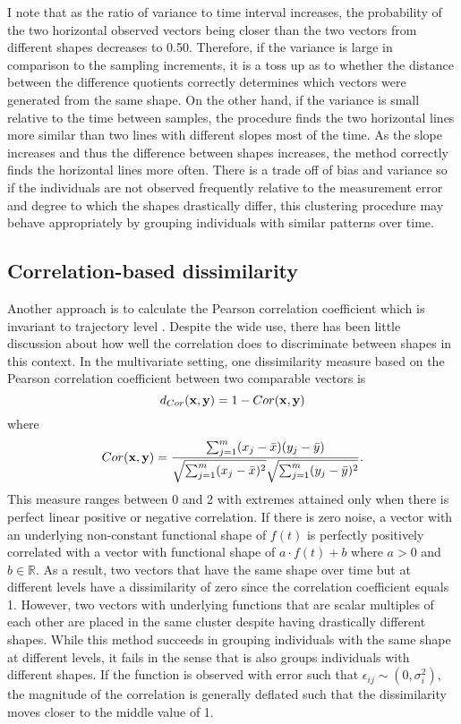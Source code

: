 I note that as the ratio of variance to time interval increases, the probability of the two horizontal observed vectors being closer than the two vectors from different shapes decreases to 0.50. Therefore, if the variance is large in comparison to the sampling increments, it is a toss up as to whether the distance between the difference quotients correctly determines which vectors were generated from the same shape. On the other hand, if the variance is small relative to the time between samples, the procedure finds the two horizontal lines more similar than two lines with different slopes most of the time. As the slope increases and thus the difference between shapes increases, the method correctly finds the horizontal lines more often. There is a trade off of bias and variance so if the individuals are not observed frequently relative to the measurement error and degree to which the shapes drastically differ, this clustering procedure may behave appropriately by grouping individuals with similar patterns over time. 

\subsection{Correlation-based dissimilarity}
Another approach is to calculate the Pearson correlation coefficient which is invariant to trajectory level \cite{chouakria2007, eisen1998, chiou2008}. Despite the wide use, there has been little discussion about how well the correlation does to discriminate between shapes in this context. In the multivariate setting, one dissimilarity measure based on the Pearson correlation coefficient between two comparable vectors is 
$$d_{Cor}(\mathbf x,\mathbf y) = 1-Cor(\mathbf x,\mathbf y)$$ 
where $$Cor(\mathbf x,\mathbf y) = \frac{\sum^{m}_{j=1}(x_{j}-\bar{x})(y_{j}-\bar{y})}{\sqrt{\sum^{m}_{j=1}(x_{j}-\bar{x})^{2}}\sqrt{\sum^{m}_{j=1}(y_{j}-\bar{y})^{2}}}.$$
This measure ranges between 0 and 2 with extremes attained only when there is perfect linear positive or negative correlation. If there is zero noise, a vector with an underlying non-constant functional shape of $f(t)$ is perfectly positively correlated with a vector with functional shape of $a\cdot f(t) + b$ where $a>0$ and $b\in\mathbb{R}$. As a result, two vectors that have the same shape over time but at different levels have a dissimilarity of zero since the correlation coefficient equals 1. However, two vectors with underlying functions that are scalar multiples of each other are placed in the same cluster despite having drastically different shapes. While this method succeeds in grouping individuals with the same shape at different levels, it fails in the sense that is also groups individuals with different shapes. If the function is observed with error such that $\epsilon_{ij}\sim(0,\sigma_{i}^{2}),$ the magnitude of the correlation is generally deflated such that the dissimilarity moves closer to the middle value of 1.

